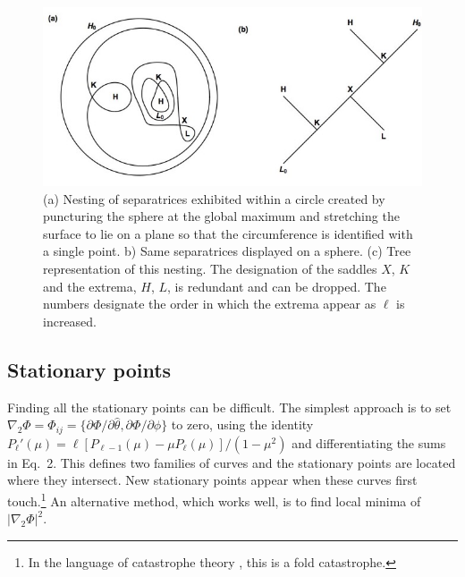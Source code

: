 \documentclass[12pt]{article}
\begin{document}
\begin{figure}[h!]
\centering
\includegraphics[width=6in]{fig4.jpg}
\caption{(a) Nesting of separatrices  exhibited within a circle created by puncturing the sphere at the global maximum and stretching the surface to lie on a plane so that the circumference is identified with a single point. b) Same separatrices displayed on a sphere. (c) Tree representation of this nesting. The designation of the saddles $X$, $K$ and the extrema, $H$, $L$, is redundant and can be dropped. The numbers designate the order in which the extrema appear as $\ell$ is increased.}
\end{figure}

\subsection{Stationary points}
Finding all the stationary points can be difficult.  The simplest approach is to set $\nabla_2\Phi=\Phi_{ij}=\{\partial\Phi/\partial{\hat\theta},\partial\Phi/\partial{\hat\phi}\}$ to zero, using the identity $P_\ell'(\mu)=\ell[P_{\ell-1}(\mu)-\mu P_\ell(\mu)]/(1-\mu^2)$ and differentiating the sums in Eq.~2. This defines two families of curves and the stationary points are located where they intersect. New stationary points appear when these curves first touch.\footnote{In the language of catastrophe theory , this is a fold catastrophe.} An alternative method, which works well, is to find local minima of $|\nabla_2\Phi|^2$.
\end{document}
